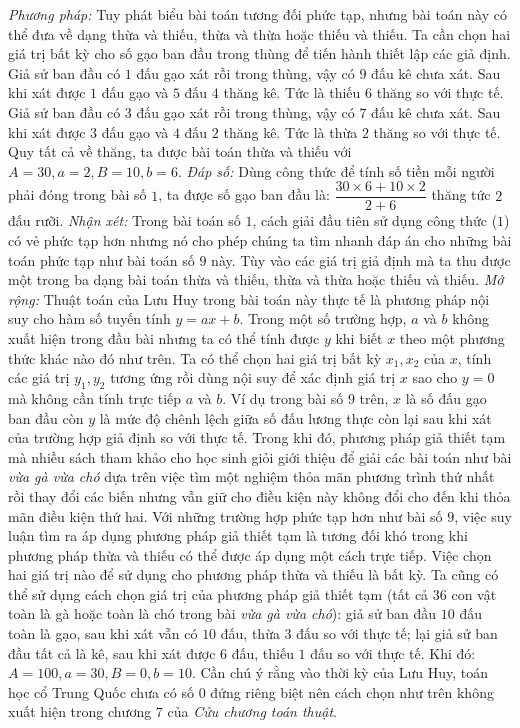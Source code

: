 \begin{multicols}{2}
	\vskip 0.1cm
	\textit{Phương pháp:} Tuy phát biểu bài toán tương đối phức tạp, nhưng bài toán này có thể đưa về dạng thừa và thiếu, thừa và thừa hoặc thiếu và thiếu. Ta cần chọn hai giá trị bất kỳ cho số gạo ban đầu trong thùng để tiến hành thiết lập các giả định.
	\vskip 0.1cm
	Giả sử ban đầu có $1$ đấu gạo xát rồi trong thùng, vậy có $9$ đấu kê chưa xát. Sau khi xát được $1$ đấu gạo và $5$ đấu $4$ thăng kê. Tức là thiếu $6$ thăng so với thực tế.
	\vskip 0.1cm
	Giả sử ban đầu có $3$ đấu gạo xát rồi trong thùng, vậy có $7$ đấu kê chưa xát. Sau khi xát được $3$ đấu gạo và $4$ đấu $2$ thăng kê. Tức là thừa $2$ thăng so với thực tế.
	\vskip 0.1cm
	Quy tất cả về thăng, ta được bài toán thừa và thiếu với $A=30,a=2,B=10,b=6$.
	\vskip 0.1cm
	\textit{Đáp số:} Dùng công thức để tính số tiền mỗi người phải đóng trong bài số $1$, ta được số gạo ban đầu là: $\dfrac{30 \times 6 + 10\times 2}{2 +6}$ thăng tức $2$ đấu rưỡi.
	\vskip 0.1cm
	\textit{Nhận xét:} Trong bài toán số $1$, cách giải đầu tiên sử dụng công thức ($1$) có vẻ phức tạp hơn nhưng nó cho phép chúng ta tìm nhanh đáp án cho những bài toán phức tạp như bài toán số $9$ này. Tùy vào các giá trị giả định mà ta thu được một trong ba dạng bài toán thừa và thiếu, thừa và thừa hoặc thiếu và thiếu.
	\vskip 0.1cm
	\textit{Mở rộng:} Thuật toán của Lưu Huy trong bài toán này thực tế là phương pháp nội suy cho hàm số tuyến tính $y=ax+b$. Trong một số trường hợp, $a$ và $b$ không xuất hiện trong đầu bài nhưng ta có thể tính được $y$ khi biết $x$ theo một phương thức khác nào đó như trên. Ta có thể chọn hai giá trị bất kỳ $x_1,x_2$ của $x$, tính các giá trị $y_1,y_2$ tương ứng rồi dùng nội suy để xác định giá trị $x$ sao cho $y=0$ mà không cần tính trực tiếp $a$ và $b$. Ví dụ trong bài số $9$ trên, $x$ là số đấu gạo ban đầu còn $y$ là mức độ chênh lệch giữa số đấu lương thực còn lại sau khi xát của trường hợp giả định so với thực tế. Trong khi đó, phương pháp giả thiết tạm mà nhiều sách tham khảo cho học sinh giỏi giới thiệu để giải các bài toán như bài \textit{vừa gà vừa chó} dựa trên việc tìm một nghiệm thỏa mãn phương trình thứ nhất rồi thay đổi các biến nhưng vẫn giữ cho điều kiện này không đổi cho đến khi thỏa mãn điều kiện thứ hai. Với những trường hợp phức tạp hơn như bài số $9$, việc suy luận tìm ra áp dụng phương pháp giả thiết tạm là tương đối khó trong khi phương pháp thừa và thiếu có thể được áp dụng một cách trực tiếp. Việc chọn hai giá trị nào để sử dụng cho phương pháp thừa và thiếu là bất kỳ. Ta cũng có thể sử dụng cách chọn giá trị của phương pháp giả thiết tạm (tất cả $36$ con vật toàn là gà hoặc toàn là chó trong bài \textit{vừa gà vừa chó}): giả sử ban đầu $10$ đấu toàn là gạo, sau khi xát vẫn có $10$ đấu, thừa $3$ đấu so với thực tế; lại giả sử ban đầu tất cả là kê, sau khi xát được $6$ đấu, thiếu $1$ đấu so với thực tế. Khi đó: $A=100,a=30,B=0,b=10$. Cần chú ý rằng vào thời kỳ của Lưu Huy, toán học cổ Trung Quốc chưa có số $0$ đứng riêng biệt nên cách chọn như trên không xuất hiện trong chương $7$ của \textit{Cửu chương toán thuật}.

\end{multicols}
